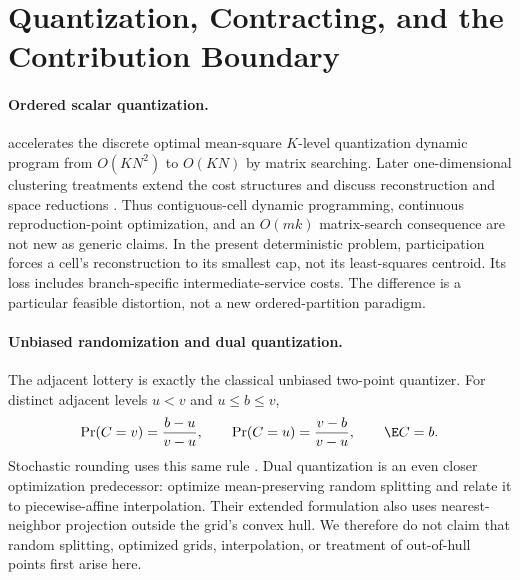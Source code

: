 \section{Quantization, Contracting, and the Contribution Boundary}\label{sec:r37-position}
\paragraph{Ordered scalar quantization.}
\citet{Wu1991} accelerates the discrete optimal mean-square $K$-level quantization dynamic program from $O(KN^2)$ to $O(KN)$ by matrix searching. Later one-dimensional clustering treatments extend the cost structures and discuss reconstruction and space reductions \citep{GronlundEtAl2017}. Thus contiguous-cell dynamic programming, continuous reproduction-point optimization, and an $O(mk)$ matrix-search consequence are not new as generic claims. In the present deterministic problem, participation forces a cell's reconstruction to its smallest cap, not its least-squares centroid. Its loss includes branch-specific intermediate-service costs. The difference is a particular feasible distortion, not a new ordered-partition paradigm.

\paragraph{Unbiased randomization and dual quantization.}
The adjacent lottery is exactly the classical unbiased two-point quantizer. For distinct adjacent levels $u<v$ and $u\leq b\leq v$,
\begin{equation}\label{eq:unbiased}
 \Pr(C=v)=\frac{b-u}{v-u},\qquad
 \Pr(C=u)=\frac{v-b}{v-u},\qquad \E C=b.
\end{equation}
Stochastic rounding uses this same rule \citep{CrociEtAl2022}. Dual quantization is an even closer optimization predecessor: \citet{PagesWilbertz2012} optimize mean-preserving random splitting and relate it to piecewise-affine interpolation. Their extended formulation also uses nearest-neighbor projection outside the grid's convex hull. We therefore do not claim that random splitting, optimized grids, interpolation, or treatment of out-of-hull points first arise here.

